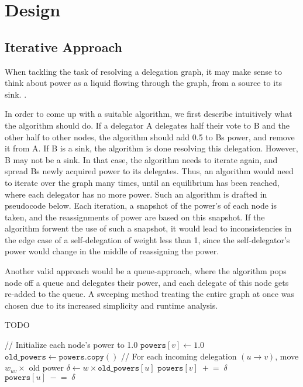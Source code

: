 
\chapter{Design}

\section{Iterative Approach}

When tackling the task of resolving a delegation graph, it may make sense to think about power as a liquid flowing through the graph, from a source to its sink. .  

In order to come up with a suitable algorithm, we first describe intuitively what the algorithm should do. If a delegator A delegates half their vote to B and the other half to other nodes, the algorithm should add 0.5 to Bs power, and remove it from A. If B is a sink, the algorithm is done resolving this delegation. However,  B may not be a sink. In that case, the algorithm needs to iterate again, and spread Bs newly acquired power to its delegates. Thus, an algorithm would need to iterate over the graph many times, until an equilibrium has been reached, where each delegator has no more power. Such an algorithm is drafted in pseudocode below. Each iteration, a snapshot of the power's of each node is taken, and the reassignments of power are based on this snapshot. If the algorithm forwent the use of such a snapshot, it would lead to inconsistencies in the edge case of a self-delegation of weight less than 1, since the self-delegator's power would change in the middle of reassigning the power. 

Another valid approach would be a queue-approach, where the algorithm pops node off a queue and delegates their power, and each delegate of this node gets re-added to the queue. A sweeping method treating the entire graph at once was chosen due to its increased simplicity and runtime analysis.

\begin{algorithm} [H]
 \caption{TODO}\label{alg:iterative_simple}
\begin{algorithmic}
\State // Initialize each node’s power to 1.0  
    \State \(\texttt{powers}[v] \gets 1.0\)
\EndFor
\Repeat
    \State \(\texttt{old\_powers} \gets \texttt{powers}.\texttt{copy}()\)  
        \State // For each incoming delegation \((u \to v)\), move \(w_{uv}\times\) old power
            \State \(\delta \gets w \times \texttt{old\_powers}[u]\)
            \State \(\texttt{powers}[v] \;+\!=\; \delta\)
            \State \(\texttt{powers}[u] \;-\!=\; \delta\)
        \EndFor
    \EndFor
{} 
\end{algorithmic}
\end{algorithm}


